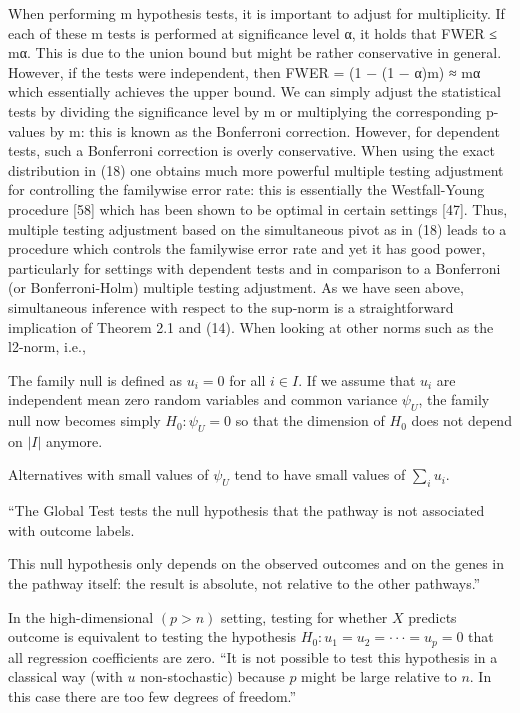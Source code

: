 \documentclass{article}
\begin{document}
When performing m hypothesis tests, it is important to adjust for multiplicity. If each of these m tests is performed at significance level α, it holds that FWER ≤ mα. This is due to the union bound but might be rather conservative in general. However, if the tests were independent, then FWER = (1 − (1 − α)m) ≈ mα which essentially achieves the upper bound. We can simply adjust the statistical tests by dividing the significance level by m or multiplying the corresponding p- values by m: this is known as the Bonferroni correction. However, for dependent tests, such a Bonferroni correction is overly conservative. When using the exact distribution in (18) one obtains much more powerful multiple testing adjustment for controlling the familywise error rate: this is essentially the Westfall-Young procedure [58] which has been shown to be optimal in certain settings [47]. Thus, multiple testing adjustment based on the simultaneous pivot as in (18) leads to a procedure which controls the familywise error rate and yet it has good power, particularly for settings with dependent tests and in comparison to a Bonferroni (or Bonferroni-Holm) multiple testing adjustment.
As we have seen above, simultaneous inference with respect to the sup-norm is a straightforward implication of Theorem 2.1 and (14). When looking at other norms such as the l2-norm, i.e.,

The family null is defined as $u_i=0$ for all $i \in I$. If we assume that $u_i$ are  independent mean zero random variables and common variance $\psi_U$, the family null now becomes simply $H_0: \psi_U = 0$ so that the dimension of $H_0$ does not depend on $|I|$ anymore.

Alternatives with small values of $\psi_U$ tend to have small values of $\sum_i u_i$.

``The Global Test tests the null hypothesis that the pathway is not associated with outcome labels. 

This null hypothesis only depends on the observed outcomes and on the genes in the pathway itself: the result is absolute, not relative to the other pathways.''

In the high-dimensional $(p>n)$ setting, testing for whether $X$ predicts outcome is equivalent to testing the hypothesis
$H_0 :u_1 = u_2 =···=u_{p} =0$
that all regression coefficients are zero. ``It is not possible to test this hypothesis in a classical way (with $u$ non-stochastic) because $p$ might be large relative to $n$. In this case there are too few degrees of freedom.''
\end{document}
